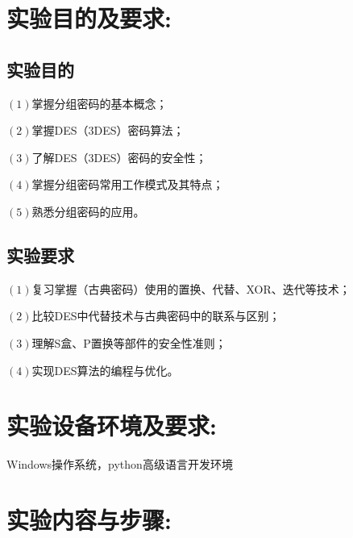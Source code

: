 \documentclass[a4paper,11pt,UTF8]{ctexart}
\begin{document}
\section{实验目的及要求:}
    \subsection{实验目的}
        $(1)$掌握分组密码的基本概念；\par
        $(2)$掌握DES（3DES）密码算法；\par
        $(3)$了解DES（3DES）密码的安全性；\par
        $(4)$掌握分组密码常用工作模式及其特点；\par
        $(5)$熟悉分组密码的应用。
    \subsection{实验要求}
        $(1)$复习掌握（古典密码）使用的置换、代替、XOR、迭代等技术；\par
        $(2)$比较DES中代替技术与古典密码中的联系与区别；\par
        $(3)$理解S盒、P置换等部件的安全性准则；\par
        $(4)$实现DES算法的编程与优化。\par


\section{实验设备环境及要求:}
    Windows操作系统，python高级语言开发环境
\newpage
\section{实验内容与步骤:}
\end{document}
